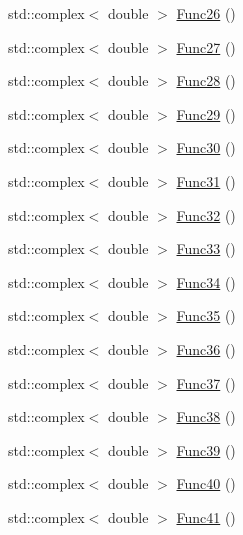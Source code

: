 \begin{DoxyCompactItemize}
std\-::complex$<$ double $>$ \hyperlink{classosea_1_1ofreq_1_1_eqn_translation_a07a7b67628d547d98af313703306deb4}{Func26} ()
\item 
std\-::complex$<$ double $>$ \hyperlink{classosea_1_1ofreq_1_1_eqn_translation_a1e4917c1414996569c68665818b16195}{Func27} ()
\item 
std\-::complex$<$ double $>$ \hyperlink{classosea_1_1ofreq_1_1_eqn_translation_ab6ffd78499c97c165fff37ed2d761a5a}{Func28} ()
\item 
std\-::complex$<$ double $>$ \hyperlink{classosea_1_1ofreq_1_1_eqn_translation_ab3699d1ca6d714f71071b91f51968ac3}{Func29} ()
\item 
std\-::complex$<$ double $>$ \hyperlink{classosea_1_1ofreq_1_1_eqn_translation_a6e3aa3b692596de5004daad5eaabde54}{Func30} ()
\item 
std\-::complex$<$ double $>$ \hyperlink{classosea_1_1ofreq_1_1_eqn_translation_a8343276916003bd905cb2bbcad5e705c}{Func31} ()
\item 
std\-::complex$<$ double $>$ \hyperlink{classosea_1_1ofreq_1_1_eqn_translation_afe1a6927cddcc56a4b81ba7623c9d798}{Func32} ()
\item 
std\-::complex$<$ double $>$ \hyperlink{classosea_1_1ofreq_1_1_eqn_translation_aa50fb32d7c423b3501fcb01e5797225e}{Func33} ()
\item 
std\-::complex$<$ double $>$ \hyperlink{classosea_1_1ofreq_1_1_eqn_translation_ae6da4b1c392f2bbf88d14e890bb5e63c}{Func34} ()
\item 
std\-::complex$<$ double $>$ \hyperlink{classosea_1_1ofreq_1_1_eqn_translation_ae8c88d445bfef665bc7c66863a84ca14}{Func35} ()
\item 
std\-::complex$<$ double $>$ \hyperlink{classosea_1_1ofreq_1_1_eqn_translation_ad63fc823e7dd2cf8f46a47c8aea927e3}{Func36} ()
\item 
std\-::complex$<$ double $>$ \hyperlink{classosea_1_1ofreq_1_1_eqn_translation_a4b65b618b6af6c3c8ab31d261e38e19d}{Func37} ()
\item 
std\-::complex$<$ double $>$ \hyperlink{classosea_1_1ofreq_1_1_eqn_translation_a5160cffb1f2b661cba71b5592f5a9a16}{Func38} ()
\item 
std\-::complex$<$ double $>$ \hyperlink{classosea_1_1ofreq_1_1_eqn_translation_a55c38e39a6f7356938d8a37f61693a22}{Func39} ()
\item 
std\-::complex$<$ double $>$ \hyperlink{classosea_1_1ofreq_1_1_eqn_translation_a522fe9bb0b2f04d6a3d25f066fe2e2fe}{Func40} ()
\item 
std\-::complex$<$ double $>$ \hyperlink{classosea_1_1ofreq_1_1_eqn_translation_aaa7f11a34e8b326b1cc042d915b518cf}{Func41} ()

\end{DoxyCompactItemize}
